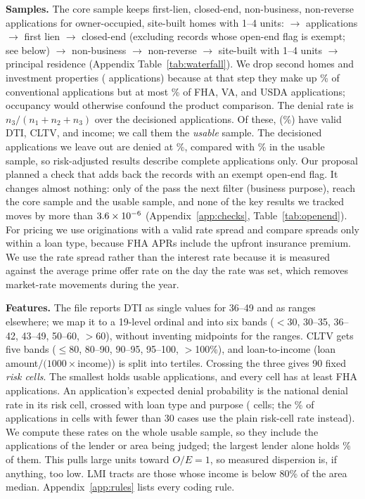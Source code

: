 \documentclass[acmtog,nonacm]{acmart}
\begin{document}
\textbf{Samples.} The core sample keeps first-lien, closed-end, non-business, non-reverse applications for owner-occupied, site-built homes with 1--4 units: \nAll{} $\to$ \nApps{} applications $\to$ \nFirstLien{} first lien $\to$ \nClosedEnd{} closed-end (excluding \nOpenEndExempt{} records whose open-end flag is exempt; see below) $\to$ \nNonBusiness{} non-business $\to$ \nNonReverse{} non-reverse $\to$ \nSiteBuilt{} site-built with 1--4 units $\to$ \nCore{} principal residence (Appendix Table~\ref{tab:waterfall}). We drop second homes and investment properties (\nNonPrincipal{} applications) because at that step they make up \occConv\% of conventional applications but at most \occGovMax\% of FHA, VA, and USDA applications; occupancy would otherwise confound the product comparison. The denial rate is $n_3/(n_1+n_2+n_3)$ over the \nDecisioned{} decisioned applications. Of these, \nUsable{} (\shareUsable\%) have valid DTI, CLTV, and income; we call them the \emph{usable} sample. The \nExcluded{} decisioned applications we leave out are denied at \drExcluded\%, compared with \baseRate\% in the usable sample, so risk-adjusted results describe complete applications only. Our proposal planned a check that adds back the records with an exempt open-end flag. It changes almost nothing: only \oeAddBusiness{} of the \nOpenEndExempt{} pass the next filter (business purpose), \oeAddCore{} reach the core sample and \oeAddUsable{} the usable sample, and none of the \oeNStats{} key results we tracked moves by more than $3.6\times10^{-6}$ (Appendix~\ref{app:checks}, Table~\ref{tab:openend}). For pricing we use \nPricing{} originations with a valid rate spread and compare spreads only within a loan type, because FHA APRs include the upfront insurance premium. We use the rate spread rather than the interest rate because it is measured against the average prime offer rate on the day the rate was set, which removes market-rate movements during the year.

\textbf{Features.} The file reports DTI as single values for 36--49 and as ranges elsewhere; we map it to a 19-level ordinal and into six bands ($<$30, 30--35, 36--42, 43--49, 50--60, $>$60), without inventing midpoints for the ranges. CLTV gets five bands ($\le$80, 80--90, 90--95, 95--100, $>$100\%), and loan-to-income (loan amount$/(1000\times$income)) is split into tertiles. Crossing the three gives 90 fixed \emph{risk cells}. The smallest holds \minCellN{} usable applications, and every cell has at least \minFHAcell{} FHA applications. An application's expected denial probability is the national denial rate in its risk cell, crossed with loan type and purpose (\nExtCells{} cells; the \fallbackShare\% of applications in cells with fewer than 30 cases use the plain risk-cell rate instead). We compute these rates on the whole usable sample, so they include the applications of the lender or area being judged; the largest lender alone holds \topLenderShare\% of them. This pulls large units toward $O/E=1$, so measured dispersion is, if anything, too low. LMI tracts are those whose income is below 80\% of the area median. Appendix~\ref{app:rules} lists every coding rule.
\end{document}
